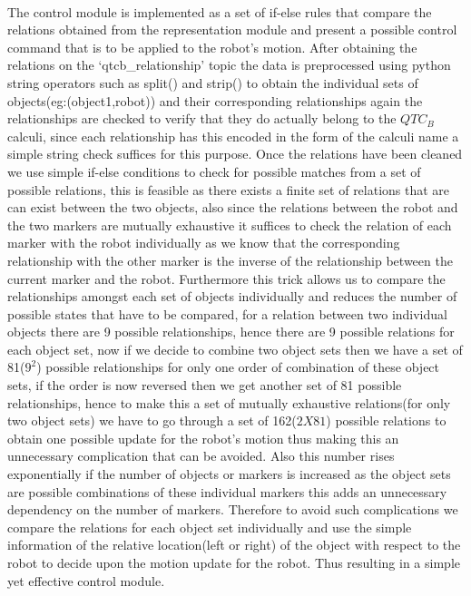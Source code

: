 \paragraph{}The control module is implemented as a set of if-else rules that compare the relations obtained from the representation module and present a possible control command that is to be applied to the robot's motion. After obtaining the relations on the `qtcb\_relationship' topic the data is preprocessed using python string operators such as split() and strip() to obtain the individual sets of objects(eg:(object1,robot)) and their corresponding relationships again the relationships are checked to verify that they do actually belong to the $QTC_B$ calculi, since each relationship has this encoded in the form of the calculi name a simple string check suffices for this purpose. Once the relations have been cleaned we use simple if-else conditions to check for possible matches from a set of possible relations, this is feasible as there exists a finite set of relations that are can exist between the two objects, also since the relations between the robot and the two markers are mutually exhaustive it suffices to check the relation of each marker with the robot individually as we know that the corresponding relationship with the other marker is the inverse of the relationship between the current marker and the robot. Furthermore this trick allows us to compare the relationships amongst each set of objects individually and reduces the number of possible states that have to be compared, for a relation between two individual objects there are 9 possible relationships, hence there are 9 possible relations for each object set, now if we decide to combine two object sets then we have a set of 81($9^2$) possible relationships for only one order of combination of these object sets, if the order is now reversed then we get another set of 81 possible relationships, hence to make this a set of mutually exhaustive relations(for only two object sets) we have to go through a set of 162($2 X 81$) possible relations to obtain one possible update for the robot's motion thus making this an unnecessary complication that can be avoided. Also this number rises exponentially if the number of objects or markers is increased as the object sets are possible combinations of these individual markers this adds an unnecessary dependency on the number of markers. Therefore to avoid such complications we compare the relations for each object set individually and use the simple information of the relative location(left or right) of the object with respect to the robot to decide upon the motion update for the robot. Thus resulting in a simple yet effective control module. 

